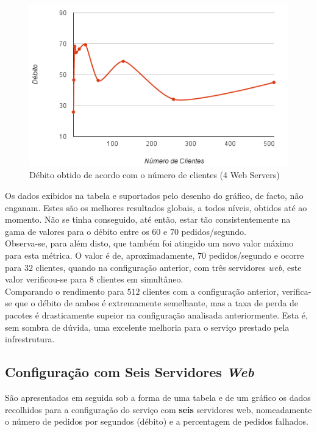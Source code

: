 \newpage

\begin{figure}[!h]
\centering
\includegraphics[scale=.6]{img/ab/web4.png}
\caption{Débito obtido de acordo com o número de clientes (4 Web Servers)}
\end{figure}


Os dados exibidos na tabela e suportados pelo desenho do gráfico, de facto, não enganam.
Estes são os melhores resultados globais, a todos níveis, obtidos até ao momento.
Não se tinha conseguido, até então, estar tão consistentemente na gama de valores para o débito entre os $60$ e $70$ pedidos/segundo. \\

Observa-se, para além disto, que também foi atingido um novo valor máximo para esta métrica.
O valor é de, aproximadamente, $70$ pedidos/segundo e ocorre para $32$ clientes, quando na configuração anterior, com três servidores \textit{web}, este valor verificou-se para $8$ clientes em simultâneo. \\

Comparando o rendimento para $512$ clientes com a configuração anterior, verifica-se que o débito de ambos é extremamente semelhante, mas a taxa de perda de pacotes é drasticamente supeior na configuração analisada anteriormente.
Esta é, sem sombra de dúvida, uma excelente melhoria para o serviço prestado pela infrestrutura.


\newpage
\subsection{Configuração com Seis Servidores \textit{Web}}

São apresentados em seguida sob a forma de uma tabela e de um gráfico os dados recolhidos para a configuração do serviço com \textbf{seis} servidores web, nomeadamente o número de pedidos por segundos (débito) e a percentagem de pedidos falhados. \\


